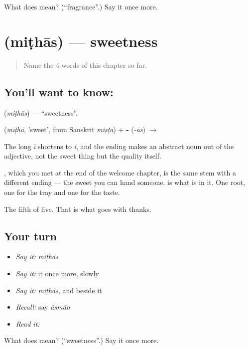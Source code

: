 \begin{tcolorbox}[breakable,colback=teal!4,colframe=teal!35!black,title={Before you move on}]
What does  mean? (\textquotedblleft{}fragrance\textquotedblright{}.) Say it once more.
\end{tcolorbox}
\section[\texorpdfstring{\hi{मिठास} (miṭhās)}{मिठास (miṭhās)}]{ (miṭhās) — sweetness}

\label{lesson:HI-C57-sweetness}



\begin{quote}
Name the 4 words of this chapter so far.
\end{quote}

\subsection*{You'll want to know: }
\textbf{} (\emph{miṭhās}) — \textquotedblleft{}sweetness\textquotedblright{}.

\textbf{} (\emph{mīṭhā}, 'sweet', from Sanskrit  \emph{miṣṭa}) + \textbf{-} (\emph{-ās}) $\to$ \textbf{}

The long \emph{ī} shortens to \emph{i}, and the ending makes an abstract noun out of the adjective, not the sweet thing but the quality itself.

, which you met at the end of the welcome chapter, is the same stem with a different ending — the sweet you can hand someone.  is what is in it. One root, one for the tray and one for the taste.

\begin{grammarlens}[title={What you've built}]
The fifth of five. That is what goes with thanks.
\end{grammarlens}

\subsection*{Your turn}
\begin{itemize}
\raggedright
  \item \emph{Say it:} \emph{miṭhās}
  \item \emph{Say it:} it once more, slowly
  \item \emph{Say it:} \emph{miṭhās}, and  beside it
  \item \emph{Recall:} say \emph{āsmān}
  \item \emph{Read it:} \textbf{}
\end{itemize}

\begin{tcolorbox}[breakable,colback=teal!4,colframe=teal!35!black,title={Before you move on}]
What does  mean? (\textquotedblleft{}sweetness\textquotedblright{}.) Say it once more.
\end{tcolorbox}
